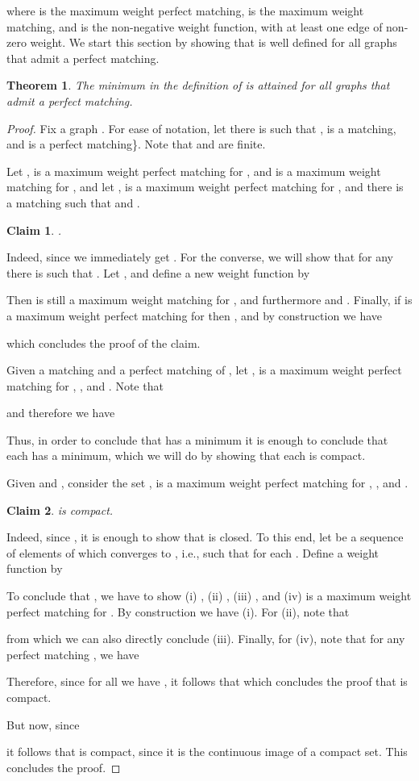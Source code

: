 \documentclass{article}
\newtheorem{thm}{Theorem}
\newtheorem{claim}{Claim}[thm]
\begin{document}
where  is the maximum weight perfect matching,  is the maximum weight matching, and  is the non-negative weight function, with at least one edge of non-zero weight. We start this section by showing that  is well defined for all graphs  that admit a perfect matching.

\begin{thm}
\label{thm_min}
The \emph{minimum} in the definition of  is attained for all
graphs  that admit a perfect matching.
\end{thm}
\begin{proof}
Fix a graph .
For ease of notation, let  there is  such that ,  is a matching, and  is a perfect matching\}.
Note that  and  are finite.

Let ,  is a maximum weight perfect matching for , and  is a maximum weight matching for , and let ,  is a maximum weight perfect matching for , and there is a matching  such that  and .
	
\begin{claim}
	.
\end{claim}
Indeed, since  we immediately get .
For the converse, we will show that for any  there is  such that .
Let , and define a new weight function  by 

Then  is still a maximum weight matching for , and furthermore  and .
Finally, if  is a maximum weight perfect matching for  then , and by construction we have 

which concludes the proof of the claim.

Given a matching  and a perfect matching  of , let ,  is a maximum weight perfect matching for , , and .
Note that	
	
and therefore we have

Thus, in order to conclude that  has a minimum it is enough to conclude that each  has a minimum, which we will do by showing that each  is compact.

Given  and , consider the set ,  is a maximum weight perfect matching for , , and .

\begin{claim}
	 is compact.
\end{claim}
Indeed, since , it is enough to show that  is closed.
To this end, let  be a sequence of elements of  which converges to , i.e., such that  for each .
Define a weight function  by 
	
To conclude that , we have to show (i) , (ii) , (iii) , and (iv)  is a maximum weight perfect matching for .
By construction we have (i). 
For (ii), note that 

from which we can also directly conclude (iii).
Finally, for (iv), note that for any perfect matching , we have 

Therefore, since for all  we have , it follows that 
which concludes the proof that  is compact.

But now, since 
	 
it follows that  is compact, since it is the continuous image of a compact set.
This concludes the proof.
\end{proof}
\end{document}
